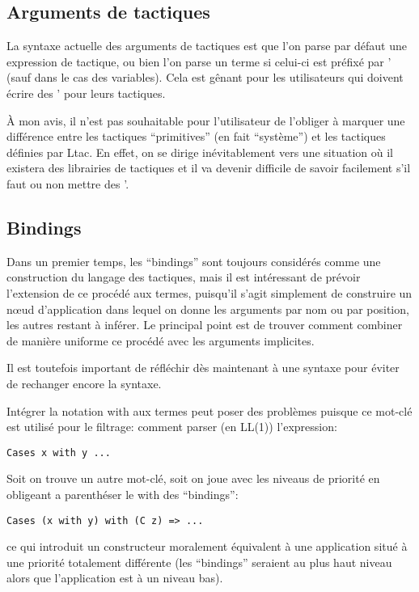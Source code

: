\documentclass{article}
\def\TERM#1{\textsf{#1}}
\begin{document}
\subsection{Arguments de tactiques}

La syntaxe actuelle des arguments de tactiques est que l'on parse par
défaut une expression de tactique, ou bien l'on parse un terme si
celui-ci est préfixé par \TERM{'} (sauf dans le cas des
variables). Cela est gênant pour les utilisateurs qui doivent écrire
des \TERM{'} pour leurs tactiques.

À mon avis, il n'est pas souhaitable pour l'utilisateur de l'obliger à
marquer une différence entre les tactiques ``primitives'' (en fait
``système'') et les tactiques définies par Ltac. En effet, on se
dirige inévitablement vers une situation où il existera des librairies
de tactiques et il va devenir difficile de savoir facilement s'il faut
ou non mettre des \TERM{'}.



\subsection{Bindings}

Dans un premier temps, les ``bindings'' sont toujours considérés comme
une construction du langage des tactiques, mais il est intéressant de
prévoir l'extension de ce procédé aux termes, puisqu'il s'agit
simplement de construire un n{\oe}ud d'application dans lequel on
donne les arguments par nom ou par position, les autres restant à
inférer. Le principal point est de trouver comment combiner de manière
uniforme ce procédé avec les arguments implicites.

Il est toutefois important de réfléchir dès maintenant à une syntaxe
pour éviter de rechanger encore la syntaxe.

Intégrer la notation \TERM{with} aux termes peut poser des problèmes
puisque ce mot-clé est utilisé pour le filtrage: comment parser (en
LL(1)) l'expression:
\begin{verbatim}
Cases x with y ...
\end{verbatim}

Soit on trouve un autre mot-clé, soit on joue avec les niveaus de
priorité en obligeant a parenthéser le \TERM{with} des ``bindings'':
\begin{verbatim}
Cases (x with y) with (C z) => ...
\end{verbatim}
ce qui introduit un constructeur moralement équivalent à une
application situé à une priorité totalement différente (les
``bindings'' seraient au plus haut niveau alors que l'application est
à un niveau bas).
\end{document}
